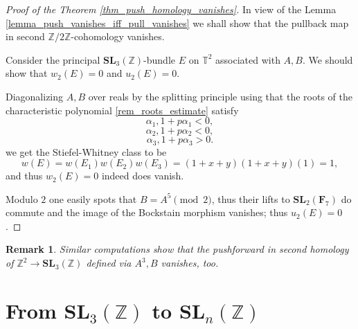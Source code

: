 \documentclass[a4paper]{article}
\newtheorem{Rem}[Thm]{Remark}
\newcommand{\SL}{\mathbf{SL}_3(\mathbb{Z})}        %
\newcommand{\SLn}{\mathbf{SL}_n(\mathbb{Z})}        %
\begin{document}
\begin{proof}[Proof of the Theorem \ref{thm_push_homology_vanishes}]
In view of the Lemma \ref{lemma_push_vanishes_iff_pull_vanishes} we shall show that the pullback map in second $\mathbb{Z}/ 2 \mathbb{Z}$-cohomology vanishes.

Consider the principal $\SL$-bundle $E$ on $\mathbb{T}^2$ associated with $A, B$.
We should show that $w_2(E) = 0$ and $u_2(E) = 0$.

Diagonalizing $A, B$ over reals by the splitting principle
using that the roots of the characteristic polynomial 
\ref{rem_roots_estimate} 
satisfy 
\[
\alpha_1, 1 + p \alpha_1 < 0, 
\] 
\[
\alpha_2, 1 + p \alpha_2 < 0, 
\] 
\[
\alpha_3, 1 + p \alpha_3 > 0 .
\] 
we get the Stiefel-Whitney class to be
\[
w(E) = w(E_1) w(E_2) w (E_3)
= (1 + x + y) (1 + x + y) (1) 
= 1
,\]
and thus $w_2(E) = 0$ indeed does vanish.

Modulo $2$ one easily spots that $B = A^5 \pmod{2}$, thus their lifts to $\mathbf{SL}_2(\mathbf{F}_7)$ do commute and the image of the Bockstain morphism vanishes; thus $u_2(E) = 0$.
\end{proof}
\begin{Rem}
Similar computations show that the pushforward in second homology of $\mathbb{Z}^2 \to \SL$ defined via $A^3, B$ vanishes, too.
\end{Rem}



\newpage
\section{From $\SL$ to $\SLn$}
\end{document}

